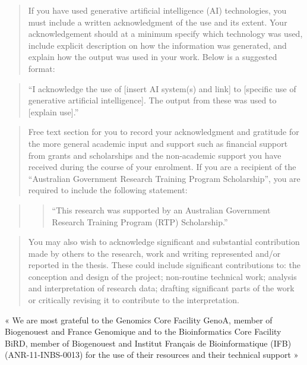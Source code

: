 \documentclass[
  11pt,
  a4paper,
]{report}
\begin{document}
\begin{quote}
If you have used generative artificial intelligence (AI) technologies,
you must include a written acknowledgment of the use and its extent.
Your acknowledgement should at a minimum specify which technology was
used, include explicit description on how the information was generated,
and explain how the output was used in your work. Below is a suggested
format:
\end{quote}

\begin{quote}
``I acknowledge the use of {[}insert AI system(s) and link{]} to
{[}specific use of generative artificial intelligence{]}. The output
from these was used to {[}explain use{]}.''
\end{quote}

\begin{quote}
Free text section for you to record your acknowledgment and gratitude
for the more general academic input and support such as financial
support from grants and scholarships and the non-academic support you
have received during the course of your enrolment. If you are a
recipient of the ``Australian Government Research Training Program
Scholarship'', you are required to include the following statement:
\end{quote}

\begin{quote}
\begin{quote}
``This research was supported by an Australian Government Research
Training Program (RTP) Scholarship.''
\end{quote}
\end{quote}

\begin{quote}
You may also wish to acknowledge significant and substantial
contribution made by others to the research, work and writing
represented and/or reported in the thesis. These could include
significant contributions to: the conception and design of the project;
non-routine technical work; analysis and interpretation of research
data; drafting significant parts of the work or critically revising it
to contribute to the interpretation.
\end{quote}

« We are most grateful to the Genomics Core Facility GenoA, member of
Biogenouest and France Genomique and to the Bioinformatics Core Facility
BiRD, member of Biogenouest and Institut Français de Bioinformatique
(IFB) (ANR-11-INBS-0013) for the use of their resources and their
technical support »
\end{document}
